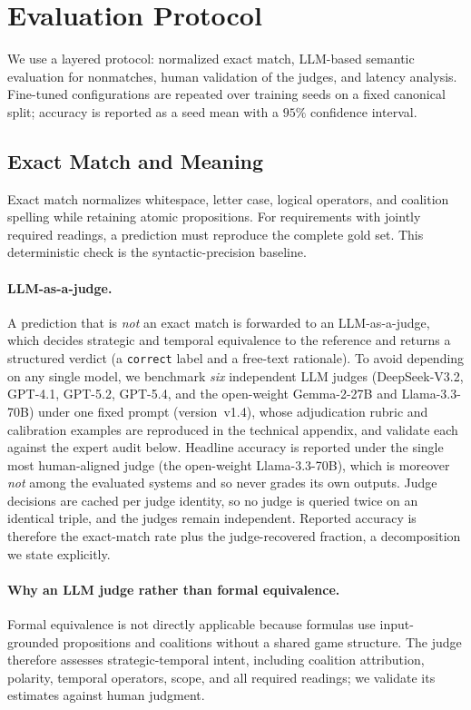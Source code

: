 \section{Evaluation Protocol}
\label{sec:evaluation}
We use a layered protocol: normalized exact match, LLM-based semantic evaluation for nonmatches, human validation of the judges, and latency analysis. Fine-tuned configurations are repeated over training seeds on a fixed canonical split; accuracy is reported as a seed mean with a $95\%$ confidence interval.

\subsection{Exact Match and Meaning}
Exact match normalizes whitespace, letter case, logical operators, and coalition spelling while retaining atomic propositions. For requirements with jointly required readings, a prediction must reproduce the complete gold set. This deterministic check is the syntactic-precision baseline.

\paragraph{LLM-as-a-judge.} A prediction that is \emph{not} an exact match is forwarded to an LLM-as-a-judge, which decides strategic and temporal equivalence to the reference and returns a structured verdict (a \texttt{correct} label and a free-text rationale). To avoid depending on any single model, we benchmark \emph{six} independent LLM judges (DeepSeek-V3.2, GPT-4.1, GPT-5.2, GPT-5.4, and the open-weight Gemma-2-27B and Llama-3.3-70B) under one fixed prompt (version~v1.4), whose adjudication rubric and calibration examples are reproduced in the technical appendix, and validate each against the expert audit below. Headline accuracy is reported under the single most human-aligned judge (the open-weight Llama-3.3-70B), which is moreover \emph{not} among the evaluated systems and so never grades its own outputs. Judge decisions are cached per judge identity, so no judge is queried twice on an identical triple, and the judges remain independent. Reported accuracy is therefore the exact-match rate plus the judge-recovered fraction, a decomposition we state explicitly.

\paragraph{Why an LLM judge rather than formal equivalence.} Formal equivalence is not directly applicable because formulas use input-grounded propositions and coalitions without a shared game structure. The judge therefore assesses strategic-temporal intent, including coalition attribution, polarity, temporal operators, scope, and all required readings; we validate its estimates against human judgment.


